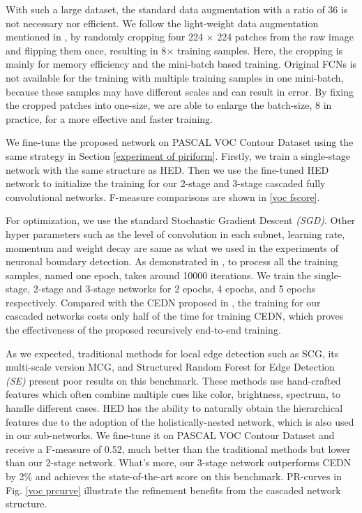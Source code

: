 \documentclass[senior]{IPSstyle}
\begin{document}
With such a large dataset, the standard data augmentation with a ratio of 36 is not necessary nor efficient. We follow the light-weight data augmentation mentioned in \cite{Yang2016}, by randomly cropping four 224 \(\times\) 224 patches from the raw image and flipping them once, resulting in 8\(\times\) training samples. Here, the cropping is mainly for memory efficiency\cite{Yang2016} and the mini-batch based training. Original FCNs\cite{Long2015} is not available for the training with multiple training samples in one mini-batch, because these samples may have different scales and can result in error. By fixing the cropped patches into one-size, we are able to enlarge the batch-size, 8 in practice, for a more effective and faster training.

We fine-tune the proposed network on PASCAL VOC Contour Dataset using the same strategy in Section \ref{experiment of piriform}. Firstly, we train a single-stage network with the same structure as HED\cite{Xie2015}. Then we use the fine-tuned HED network to initialize the training for our 2-stage and 3-stage cascaded fully convolutional networks. F-measure comparisons are shown in \ref{voc fscore}. 

For optimization, we use the standard Stochastic Gradient Descent \emph{(SGD)}. Other hyper parameters such as the level of convolution in each subnet, learning rate, momentum and weight decay are same as what we used in the experiments of neuronal boundary detection. As demonstrated in \cite{Yang2016}, to process all the training samples, named one epoch, takes around 10000 iterations. We train the single-stage, 2-stage and 3-stage networks for 2 epochs, 4 epochs, and 5 epochs respectively. Compared with the CEDN proposed in \cite{Yang2016}, the training for our cascaded networks costs only half of the time for training CEDN, which proves the effectiveness of the proposed recursively end-to-end training.

As we expected, traditional methods for local edge detection such as SCG, its multi-scale version MCG\cite{Arbelaez2014}, and Structured Random Forest for Edge Detection \emph{(SE)}\cite{Dollar2013} present poor results on this benchmark. These methods use hand-crafted features which often combine multiple cues like color, brightness, spectrum, to handle different cases. HED\cite{Xie2015} has the ability to naturally obtain the hierarchical features due to the adoption of the holistically-nested network, which is also used in our sub-networks. We fine-tune it on PASCAL VOC Contour Dataset and receive a F-measure of 0.52, much better than the traditional methods but lower than our 2-stage network. What's more, our 3-stage network outperforms CEDN\cite{Yang2016} by 2\% and achieves the state-of-the-art score on this benchmark. PR-curves in Fig. \ref{voc prcurve} illustrate the refinement benefits from the cascaded network structure.
\end{document}
